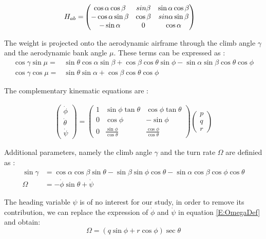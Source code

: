 \begin{align}
H_{ab} =& 
\begin{pmatrix}
\cos\alpha \cos\beta & sin\beta & \sin\alpha \cos\beta\\
-\cos\alpha \sin\beta & \cos\beta & \-sin\alpha \sin\beta\\
-\sin\alpha & 0 & \cos\alpha 
\end{pmatrix}
\end{align}

The weight is projected onto the aerodynamic airframe through the climb angle $\gamma$ and the aerodynamic bank angle $\mu$. These terms can be expressed as \cite{Boiffier}:
\begin{align}
\cos\gamma \sin\mu =& \sin\theta \cos\alpha \sin\beta + \cos\beta\cos\theta\sin\phi - \sin\alpha\sin\beta\cos\theta\cos\phi\\
\cos\gamma \cos\mu =& \sin\theta\sin\alpha + \cos\beta\cos\theta\cos\phi
\end{align}

The complementary kinematic equations are :

\begin{align}
\begin{pmatrix}
\dot{\phi}\\
\dot{\theta}\\
\dot{\psi}
\end{pmatrix}
= \begin{pmatrix}
1 & \sin\phi \tan\theta & \cos\phi \tan\theta\\
0 & \cos\phi & -\sin \phi\\
0 &\frac{\sin\phi}{\cos\theta} & \frac{\cos \phi}{\cos \theta}
\end{pmatrix}
\begin{pmatrix}
p\\
q\\
r
\end{pmatrix} \label{E:kinematics}
\end{align}

Additional parameters, namely the climb angle $\gamma$ and the turn rate $\Omega$ are definied as :
\begin{align}
\sin \gamma &= \cos\alpha\cos\beta\sin\theta - \sin\beta\sin\phi\cos\theta - \sin\alpha\cos\beta\cos\phi\cos\theta \label{E:gammaDef}\\
\Omega &= -\dot{\phi}\sin\theta + \dot{\psi} \label{E:OmegaDef}
\end{align}

The heading variable $\psi$ is of no interest for our study, in order to remove its contribution, we can replace the expression of $\dot{\phi}$ and $\dot{\psi}$ in equation \ref{E:OmegaDef} and obtain:
\begin{equation}
\Omega = \left( q \sin \phi + r \cos \phi \right) \sec \theta \label{E:OmegaUse}
\end{equation}

